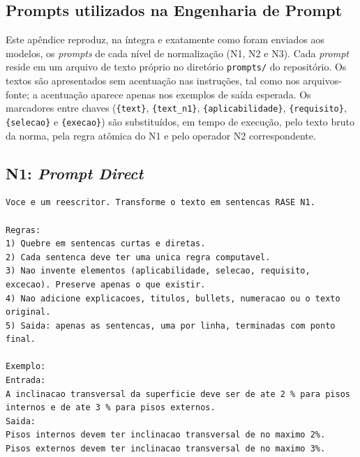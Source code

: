 \begin{apendicesenv}

\partapendices

\chapter{Prompts utilizados na Engenharia de Prompt}
\label{ap:prompts}

Este apêndice reproduz, na íntegra e exatamente como foram enviados aos modelos, os \textit{prompts} de cada nível de normalização (N1, N2 e N3). Cada \textit{prompt} reside em um arquivo de texto próprio no diretório \texttt{prompts/} do repositório. Os textos são apresentados sem acentuação nas instruções, tal como nos arquivos-fonte; a acentuação aparece apenas nos exemplos de saída esperada. Os marcadores entre chaves (\verb|{text}|, \verb|{text_n1}|, \verb|{aplicabilidade}|, \verb|{requisito}|, \verb|{selecao}| e \verb|{execao}|) são substituídos, em tempo de execução, pelo texto bruto da norma, pela regra atômica do N1 e pelo operador N2 correspondente.

\section{N1: \textit{Prompt Direct}}

\begin{lstlisting}[caption={\textit{Prompt} do nível N1 (\textit{Prompt Direct}): \texttt{prompts/n1.txt}.}, label={lst:n1}]
Voce e um reescritor. Transforme o texto em sentencas RASE N1.

Regras:
1) Quebre em sentencas curtas e diretas.
2) Cada sentenca deve ter uma unica regra computavel.
3) Nao invente elementos (aplicabilidade, selecao, requisito, excecao). Preserve apenas o que existir.
4) Nao adicione explicacoes, titulos, bullets, numeracao ou o texto original.
5) Saida: apenas as sentencas, uma por linha, terminadas com ponto final.

Exemplo:
Entrada:
A inclinacao transversal da superficie deve ser de ate 2 % para pisos internos e de ate 3 % para pisos externos.
Saida:
Pisos internos devem ter inclinacao transversal de no maximo 2%.
Pisos externos devem ter inclinacao transversal de no maximo 3%.


\end{lstlisting}
\end{apendicesenv}
